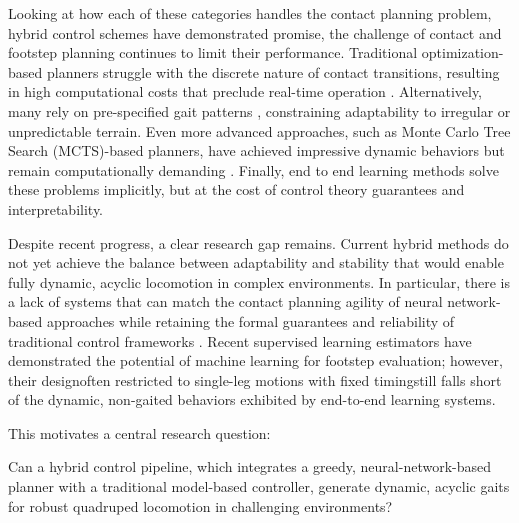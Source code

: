 Looking at how each of these categories handles the contact planning
problem, hybrid control schemes have demonstrated promise, the
challenge of contact and footstep planning continues to limit their
performance. Traditional optimization-based planners struggle with
the discrete nature of contact transitions, resulting in high
computational costs that preclude real-time operation
\cite{winkler_gait_2018}. Alternatively, many rely on pre-specified
gait patterns \cite{xie_glide_2023, grandia_perceptive_2022,
lee_learning_2020, villarreal_fast_2019}, constraining adaptability
to irregular or unpredictable terrain. Even more advanced approaches,
such as Monte Carlo Tree Search (MCTS)-based planners, have achieved
impressive dynamic behaviors but remain computationally demanding
\cite{amatucci_monte_2022, taouil_non-gaited_2024}. Finally, end to end
learning methods solve these problems implicitly, but at the cost of
control theory guarantees and interpretability.

Despite recent progress, a clear research gap remains. Current hybrid
methods do not yet achieve the balance between adaptability and
stability that would enable fully dynamic, acyclic locomotion in
complex environments. In particular, there is a lack of systems that
can match the contact planning agility of neural network-based
approaches while retaining the formal guarantees and reliability of
traditional control frameworks \cite{Meng2023Mar, Wensing2022Nov}.
Recent supervised learning estimators have
demonstrated the potential of machine learning for footstep evaluation;
however, their design\textemdash often restricted to single-leg motions with
fixed timing\textemdash still falls short of the dynamic, non-gaited
behaviors exhibited by end-to-end learning systems.

This motivates a central research question:

\begin{emphasis}
  Can a hybrid control pipeline, which integrates a greedy,
  neural-network-based planner with a traditional model-based
  controller, generate dynamic, acyclic gaits for robust quadruped
  locomotion in challenging environments?
\end{emphasis}
